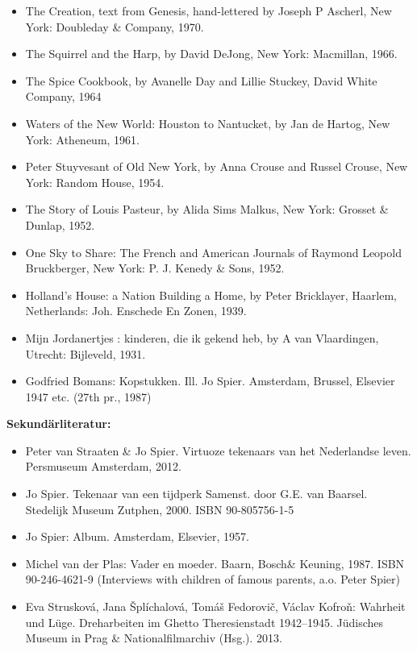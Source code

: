 \documentclass[a4paper]{article}
\begin{document}
\begin{itemize}
\item The Creation, text from Genesis, hand-lettered by Joseph P Ascherl, New York: Doubleday \& Company, 1970. 
\item  The Squirrel and the Harp, by David DeJong, New York: Macmillan, 1966.  
\item The Spice Cookbook, by Avanelle Day and Lillie Stuckey, David White Company, 1964  
\item Waters of the New World: Houston to Nantucket, by Jan de Hartog, New York: Atheneum, 1961.  
\item Peter Stuyvesant of Old New York, by Anna Crouse and Russel Crouse, New York: Random House, 1954.  
\item The Story of Louis Pasteur, by Alida Sims Malkus, New York: Grosset \& Dunlap, 1952.  
\item One Sky to Share: The French and American Journals of Raymond Leopold Bruckberger, New York: P. J. Kenedy \& Sons,
1952.  
\item Holland's House: a Nation Building a Home, by Peter Bricklayer, Haarlem, Netherlands: Joh. Enschede En Zonen,
1939.  
\item Mijn Jordanertjes : kinderen, die ik gekend heb, by A van Vlaardingen, Utrecht: Bijleveld, 1931. 
\item Godfried Bomans: Kopstukken. Ill. Jo Spier. Amsterdam, Brussel, Elsevier 1947 etc. (27th pr., 1987)
\end{itemize}

\bigskip

\textbf{Sekundärliteratur:}

\begin{itemize}
\item Peter van Straaten \& Jo Spier. Virtuoze tekenaars van het Nederlandse leven. Persmuseum Amsterdam, 2012.  
\item Jo Spier. Tekenaar van een tijdperk Samenst. door G.E. van Baarsel. Stedelijk Museum Zutphen, 2000. ISBN
90-805756-1-5  
\item Jo Spier: Album. Amsterdam, Elsevier, 1957. 
\item Michel van der Plas: Vader en moeder. Baarn, Bosch\& Keuning, 1987. ISBN 90-246-4621-9 (Interviews with children
of famous parents, a.o. Peter Spier) 
\item Eva Strusková, Jana Šplíchalová, Tomáš Fedorovič, Václav Kofroň: Wahrheit und Lüge. Dreharbeiten im Ghetto
Theresienstadt 1942–1945. Jüdisches Museum in Prag \& Nationalfilmarchiv (Hsg.). 2013.
\end{itemize}
\end{document}
